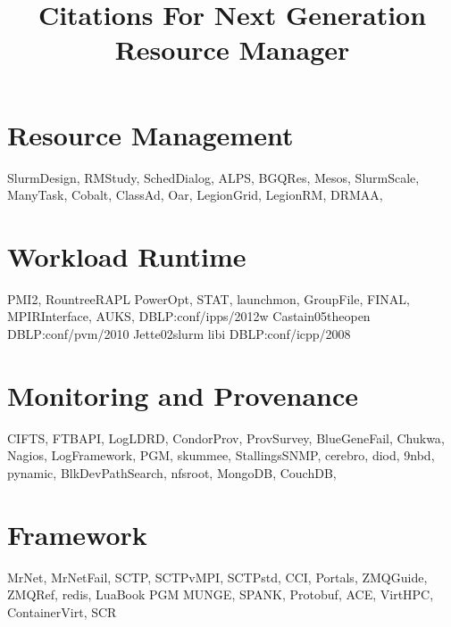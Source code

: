 \documentclass{article}
\newcommand{\ngrmfull}{Next Generation Resource Manager}
\begin{document}
\title{Citations For \ngrmfull}
\maketitle

\section{Resource Management}

SlurmDesign\cite{SlurmDesign},
RMStudy\cite{RMStudy},
SchedDialog\cite{SchedDialog},
ALPS\cite{ALPS},
BGQRes\cite{BGQRes},
Mesos\cite{Mesos},
SlurmScale\cite{SlurmScale},
ManyTask\cite{ManyTask},
Cobalt\cite{Cobalt},
ClassAd\cite{ClassAd},
Oar\cite{Oar},
LegionGrid\cite{LegionGrid},
LegionRM\cite{LegionRM},
DRMAA\cite{DRMAA},

\section{Workload Runtime}

PMI2\cite{PMI2},
RountreeRAPL\cite{RountreeRAPL}
PowerOpt\cite{PowerOpt},
STAT\cite{STAT},
launchmon\cite{launchmon},
GroupFile\cite{GroupFile},
FINAL\cite{FINAL},
MPIRInterface\cite{MPIRInterface},
AUKS\cite{AUKS},
DBLP:conf/ipps/2012w\cite{DBLP:conf/ipps/2012w}
Castain05theopen\cite{Castain05theopen}
DBLP:conf/pvm/2010\cite{DBLP:conf/pvm/2010}
Jette02slurm\cite{Jette02slurm}
libi\cite{libi}
DBLP:conf/icpp/2008\cite{DBLP:conf/icpp/2008}

\section{Monitoring and Provenance}

CIFTS\cite{CIFTS},
FTBAPI\cite{FTBAPI},
LogLDRD\cite{LogLDRD},
CondorProv\cite{CondorProv},
ProvSurvey\cite{ProvSurvey},
BlueGeneFail\cite{BlueGeneFail},
Chukwa\cite{Chukwa},
Nagios\cite{Nagios},
LogFramework\cite{LogFramework},
PGM\cite{rfc3208},
skummee\cite{skummee},
StallingsSNMP\cite{StallingsSNMP},
cerebro\cite{cerebro},
diod\cite{diod},
9nbd\cite{9nbd},
pynamic\cite{pynamic},
BlkDevPathSearch\cite{BlkDevPathSearch},
nfsroot\cite{nfsroot},
MongoDB\cite{MongoDB},
CouchDB\cite{CouchDB},

\section{Framework}

MrNet\cite{MrNet},
MrNetFail\cite{MrNetFail},
SCTP\cite{SCTP},
SCTPvMPI\cite{SCTPvMPI},
SCTPstd\cite{SCTPstd},
CCI\cite{CCI},
Portals\cite{Portals},
ZMQGuide\cite{ZMQGuide},
ZMQRef\cite{ZMQRef},
redis\cite{redis},
LuaBook\cite{LuaBook}
PGM\cite{rfc3208}
MUNGE\cite{munge},
SPANK\cite{SPANK},
Protobuf\cite{Protobuf},
ACE\cite{ACE},
VirtHPC\cite{VirtHPC},
ContainerVirt\cite{ContainerVirt},
SCR\cite{SCR}



\end{document}
